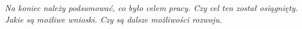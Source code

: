 \textit{Na koniec należy podsumować, co było celem pracy. 
Czy cel ten został osiągnięty. Jakie są możliwe wnioski. 
Czy są dalsze możliwości rozwoju.}